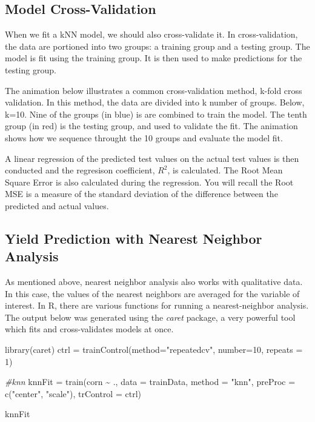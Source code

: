 \documentclass[
]{book}
\newenvironment{Shaded}{\begin{snugshade}}{\end{snugshade}}
\newcommand{\AttributeTok}[1]{\textcolor[rgb]{0.77,0.63,0.00}{#1}}
\newcommand{\CommentTok}[1]{\textcolor[rgb]{0.56,0.35,0.01}{\textit{#1}}}
\newcommand{\DecValTok}[1]{\textcolor[rgb]{0.00,0.00,0.81}{#1}}
\newcommand{\FunctionTok}[1]{\textcolor[rgb]{0.00,0.00,0.00}{#1}}
\newcommand{\NormalTok}[1]{#1}
\newcommand{\OtherTok}[1]{\textcolor[rgb]{0.56,0.35,0.01}{#1}}
\newcommand{\SpecialCharTok}[1]{\textcolor[rgb]{0.00,0.00,0.00}{#1}}
\newcommand{\StringTok}[1]{\textcolor[rgb]{0.31,0.60,0.02}{#1}}
\begin{document}
\hypertarget{model-cross-validation}{%
\subsection{Model Cross-Validation}\label{model-cross-validation}}

When we fit a kNN model, we should also cross-validate it. In cross-validation, the data are portioned into two groups: a training group and a testing group. The model is fit using the training group. It is then used to make predictions for the testing group.

The animation below illustrates a common cross-validation method, k-fold cross validation. In this method, the data are divided into k number of groups. Below, k=10. Nine of the groups (in blue) is are combined to train the model. The tenth group (in red) is the testing group, and used to validate the fit. The animation shows how we sequence throught the 10 groups and evaluate the model fit.

A linear regression of the predicted test values on the actual test values is then conducted and the regresison coefficient, \(R^2\), is calculated. The Root Mean Square Error is also calculated during the regression. You will recall the Root MSE is a measure of the standard deviation of the difference between the predicted and actual values.

\hypertarget{yield-prediction-with-nearest-neighbor-analysis}{%
\subsection{Yield Prediction with Nearest Neighbor Analysis}\label{yield-prediction-with-nearest-neighbor-analysis}}

As mentioned above, nearest neighbor analysis also works with qualitative data. In this case, the values of the nearest neighbors are averaged for the variable of interest. In R, there are various functions for running a nearest-neighbor analysis. The output below was generated using the \emph{caret} package, a very powerful tool which fits and cross-validates models at once.

\begin{Shaded}
\begin{Highlighting}[]
\FunctionTok{library}\NormalTok{(caret)}
\NormalTok{ctrl }\OtherTok{=} \FunctionTok{trainControl}\NormalTok{(}\AttributeTok{method=}\StringTok{"repeatedcv"}\NormalTok{, }\AttributeTok{number=}\DecValTok{10}\NormalTok{, }\AttributeTok{repeats =} \DecValTok{1}\NormalTok{)}

\CommentTok{\#knn}
\NormalTok{knnFit }\OtherTok{=} \FunctionTok{train}\NormalTok{(corn }\SpecialCharTok{\textasciitilde{}}\NormalTok{ .,}
                \AttributeTok{data =}\NormalTok{ trainData,}
                \AttributeTok{method =} \StringTok{"knn"}\NormalTok{,}
                \AttributeTok{preProc =} \FunctionTok{c}\NormalTok{(}\StringTok{"center"}\NormalTok{, }\StringTok{"scale"}\NormalTok{),}
                \AttributeTok{trControl =}\NormalTok{ ctrl)}


\NormalTok{knnFit}
\end{Highlighting}
\end{Shaded}
\end{document}
